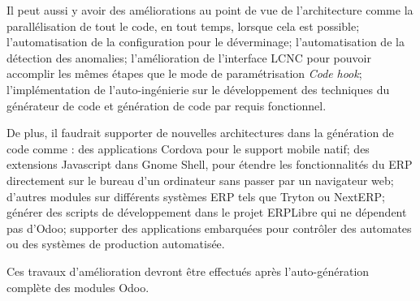 


Il peut aussi y avoir des améliorations au point de vue de l'architecture comme la parallélisation de tout le code, en tout temps, lorsque cela est possible; l'automatisation de la configuration pour le déverminage; l'automatisation de la détection des anomalies; l'amélioration de l’interface LCNC pour pouvoir accomplir les mêmes étapes que le mode de paramétrisation \textit{Code} \textit{hook}; l'implémentation de l'auto-ingénierie sur le développement des techniques du générateur de code et génération de code par requis fonctionnel.

De plus, il faudrait supporter de nouvelles architectures dans la génération de code comme : des applications Cordova pour le support mobile natif;  des extensions Javascript dans Gnome Shell, pour étendre les fonctionnalités du ERP directement sur le bureau d’un ordinateur sans passer par un navigateur web; d'autres modules sur différents systèmes ERP tels que Tryton ou NextERP; générer des scripts de développement dans le projet ERPLibre qui ne dépendent pas d’Odoo; supporter des applications embarquées pour contrôler des automates ou des systèmes de production automatisée.






Ces travaux d’amélioration devront être effectués après l’auto-génération complète des modules Odoo.



